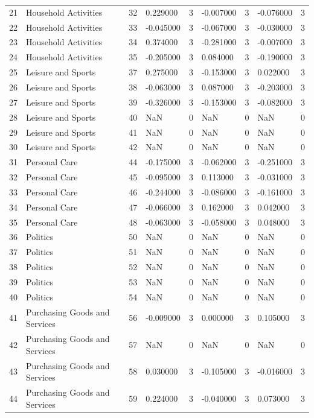 \begin{tabular}{lllllllll}
21 & Household Activities & 32 & 0.229000 & 3 & -0.007000 & 3 & -0.076000 & 3 \\
22 & Household Activities & 33 & -0.045000 & 3 & -0.067000 & 3 & -0.030000 & 3 \\
23 & Household Activities & 34 & 0.374000 & 3 & -0.281000 & 3 & -0.007000 & 3 \\
24 & Household Activities & 35 & -0.205000 & 3 & 0.084000 & 3 & -0.190000 & 3 \\
25 & Leisure and Sports & 37 & 0.275000 & 3 & -0.153000 & 3 & 0.022000 & 3 \\
26 & Leisure and Sports & 38 & -0.063000 & 3 & 0.087000 & 3 & -0.203000 & 3 \\
27 & Leisure and Sports & 39 & -0.326000 & 3 & -0.153000 & 3 & -0.082000 & 3 \\
28 & Leisure and Sports & 40 & NaN & 0 & NaN & 0 & NaN & 0 \\
29 & Leisure and Sports & 41 & NaN & 0 & NaN & 0 & NaN & 0 \\
30 & Leisure and Sports & 42 & NaN & 0 & NaN & 0 & NaN & 0 \\
31 & Personal Care & 44 & -0.175000 & 3 & -0.062000 & 3 & -0.251000 & 3 \\
32 & Personal Care & 45 & -0.095000 & 3 & 0.113000 & 3 & -0.031000 & 3 \\
33 & Personal Care & 46 & -0.244000 & 3 & -0.086000 & 3 & -0.161000 & 3 \\
34 & Personal Care & 47 & -0.066000 & 3 & 0.162000 & 3 & 0.042000 & 3 \\
35 & Personal Care & 48 & -0.063000 & 3 & -0.058000 & 3 & 0.048000 & 3 \\
36 & Politics & 50 & NaN & 0 & NaN & 0 & NaN & 0 \\
37 & Politics & 51 & NaN & 0 & NaN & 0 & NaN & 0 \\
38 & Politics & 52 & NaN & 0 & NaN & 0 & NaN & 0 \\
39 & Politics & 53 & NaN & 0 & NaN & 0 & NaN & 0 \\
40 & Politics & 54 & NaN & 0 & NaN & 0 & NaN & 0 \\
41 & Purchasing Goods and Services & 56 & -0.009000 & 3 & 0.000000 & 3 & 0.105000 & 3 \\
42 & Purchasing Goods and Services & 57 & NaN & 0 & NaN & 0 & NaN & 0 \\
43 & Purchasing Goods and Services & 58 & 0.030000 & 3 & -0.105000 & 3 & -0.016000 & 3 \\
44 & Purchasing Goods and Services & 59 & 0.224000 & 3 & -0.040000 & 3 & 0.073000 & 3 \\

\end{tabular}
